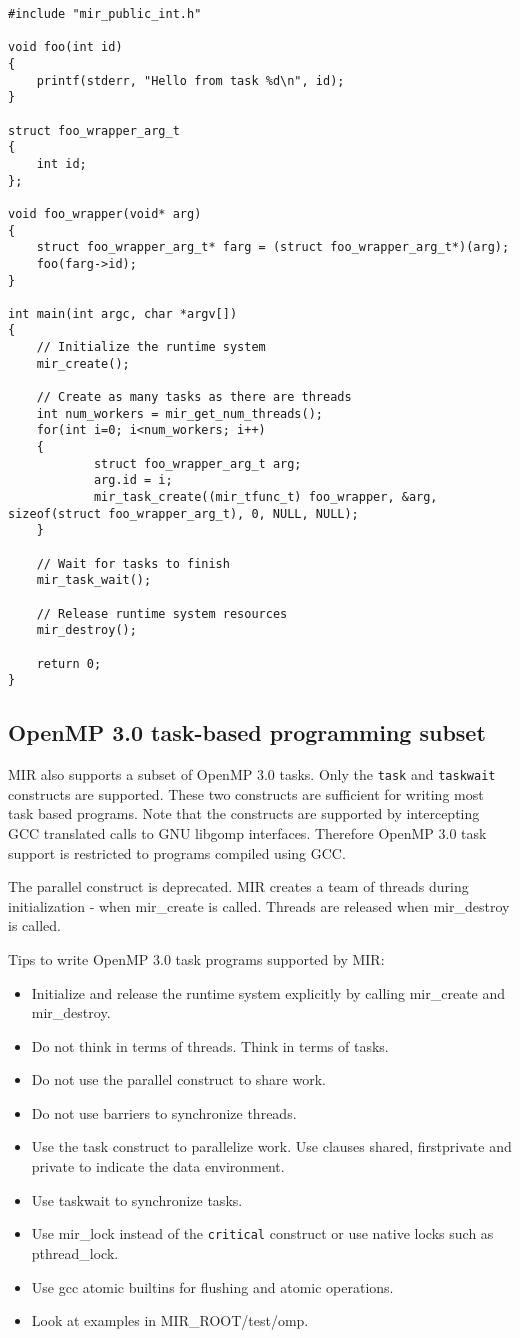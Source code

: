 \documentclass[11pt,a4paper,notitlepage]{article}
\begin{document}
\begin{lstlisting}[style=BashInputStyle]
#include "mir_public_int.h"

void foo(int id)
{
    printf(stderr, "Hello from task %d\n", id);
}

struct foo_wrapper_arg_t 
{
    int id;
};

void foo_wrapper(void* arg)
{
    struct foo_wrapper_arg_t* farg = (struct foo_wrapper_arg_t*)(arg);
    foo(farg->id);
}

int main(int argc, char *argv[])
{
    // Initialize the runtime system
    mir_create();

    // Create as many tasks as there are threads
    int num_workers = mir_get_num_threads();
    for(int i=0; i<num_workers; i++)
    {
            struct foo_wrapper_arg_t arg;
            arg.id = i;
            mir_task_create((mir_tfunc_t) foo_wrapper, &arg, sizeof(struct foo_wrapper_arg_t), 0, NULL, NULL);
    }
        
    // Wait for tasks to finish
    mir_task_wait();

    // Release runtime system resources
    mir_destroy();

    return 0;
}
\end{lstlisting}

\subsection{OpenMP 3.0 task-based programming subset}
MIR also supports a subset of OpenMP 3.0 tasks. 
Only the \texttt{task} and \texttt{taskwait} constructs are supported.
These two constructs are sufficient for writing most task based programs.
Note that the constructs are supported by intercepting GCC translated calls to GNU libgomp interfaces.
Therefore OpenMP 3.0 task support is restricted to programs compiled using GCC.

The parallel construct is deprecated.
MIR creates a team of threads during initialization - when mir\_create is called.
Threads are released when mir\_destroy is called.

Tips to write OpenMP 3.0 task programs supported by MIR:
\begin{itemize}
\item Initialize and release the runtime system explicitly by calling mir\_create and mir\_destroy.
\item Do not think in terms of threads. Think in terms of tasks.
\item Do not use the parallel construct to share work. 
\item Do not use barriers to synchronize threads.
\item Use the task construct to parallelize work. Use clauses shared, firstprivate and private to indicate the data environment.
\item Use taskwait to synchronize tasks.
\item Use mir\_lock instead of the \texttt{critical} construct or use native locks such as pthread\_lock.
\item Use gcc atomic builtins for flushing and atomic operations.
\item Look at examples in MIR\_ROOT/test/omp.
\end{itemize}
\end{document}
